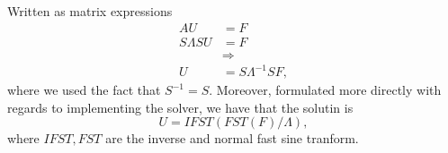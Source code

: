 Written as matrix expressions
\begin{align}
  A U &= F\\
  S\Lambda S U &= F\\
  &\Rightarrow\\
  U &= S\Lambda^{-1} S F,
\end{align}
where we used the fact that $S^{-1} = S$.
Moreover, formulated more directly with regards to implementing the solver, we have that the solutin is
$$
U = IFST(FST(F) / \Lambda),
$$
where $IFST, FST$ are the inverse and normal fast sine tranform.
